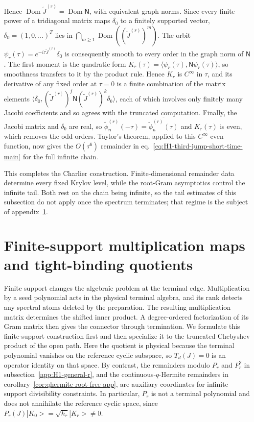 \documentclass[a4paper,11pt]{article}
\def\ket#1{|#1>}%
\def\ii{i}%
\def\ee{e}%
\def\Jac{J}%
\theoremstyle{definition}
\theoremstyle{remark}
\newcommand{\ket}[1]{|#1\rangle}
\newcommand{\ii}{\mathrm i}
\newcommand{\ee}{\mathrm e}
\newcommand{\Jac}{\mathsf J}
\newcommand{\Dom}{\operatorname{Dom}}
\newcommand{\tphi}{\widetilde\phi}
\begin{document}
Hence
\(\Dom\widetilde{\Jac}^{(r)}=\Dom\mathsf N\), with equivalent graph
norms. Since every
finite power of a tridiagonal matrix maps $\delta_0$ to a finitely
supported vector, $\delta_0=(1,0,\ldots)^T$ lies in \(\bigcap_{m\ge1}\Dom((\widetilde{\Jac}^{(r)})^m)\). The orbit
\(\psi_r(\tau)=\ee^{-\ii\tau\widetilde{\Jac}^{(r)}}\delta_0\) is consequently
smooth to every order in the graph norm of \(\mathsf N\). The first moment is the quadratic form
$K_r(\tau)=\langle\psi_r(\tau),\mathsf N\psi_r(\tau)\rangle$, so smoothness transfers to it by the
product rule. Hence $K_r$ is $C^\infty$ in $\tau$, and its derivative of
any fixed order at $\tau=0$ is a finite combination of the matrix elements
$\langle\delta_0,(\widetilde{\Jac}^{(r)})^{j}\mathsf N(\widetilde{\Jac}^{(r)})^{k}\delta_0\rangle$,
each of which involves only finitely many Jacobi coefficients and so agrees with the truncated
computation. Finally,
the Jacobi matrix and \(\delta_0\) are real, so
\(\tphi_n^{(r)}(-\tau)
=\overline{\tphi_n^{(r)}(\tau)}\) and \(K_r(\tau)\) is even, which removes the odd orders.
Taylor's theorem, applied to this $C^\infty$ even function, now gives the \(O(\tau^6)\) remainder in
eq.~\eqref{eq:H1-third-jump-short-time-main} for the full infinite
chain.

This completes the Charlier construction. Finite-dimensional remainder
data determine every fixed Krylov level, while the root-Gram asymptotics
control the infinite tail. Both rest on the chain being infinite, so the tail estimates of
this subsection do not apply once the spectrum terminates; that regime is the subject of
appendix~\ref{app:finite}.%

\section{Finite-support multiplication maps and tight-binding quotients}
\label{app:finite}

Finite support changes the algebraic problem at the terminal edge.
Multiplication by a seed polynomial acts in the physical terminal algebra,
and its rank detects any spectral atoms deleted by the preparation.  The
resulting multiplication matrix determines the shifted inner product. A
degree-ordered factorization of its Gram matrix then gives the connector
through termination.  We formulate this finite-support construction first
and then specialize it to the truncated Chebyshev product of the open path.
Here the quotient is physical because the terminal polynomial vanishes on
the reference cyclic subspace, so $T_d(\Jac)=0$ is an operator identity on that space.
By contrast, the remainders modulo
$P_r$ and $P_r^2$ in subsection~\ref{app:H1-general-r}, and the
continuous-$q$-Hermite remainders in corollary~\ref{cor:qhermite-root-free-app},
are auxiliary coordinates for
infinite-support divisibility constraints.  In particular,
$P_r$ is not a terminal polynomial and does not annihilate the reference cyclic space, since
$P_r(\Jac)\ket{K_0}=\sqrt{h_r}\ket{K_r}\ne0$.
\end{document}
